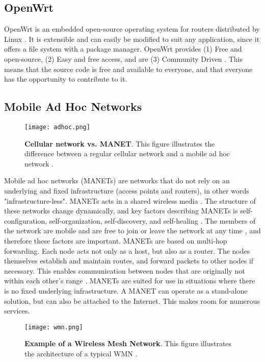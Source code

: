 \subsection{OpenWrt}
\label{subsec:openwrt}
OpenWrt is an embedded open-source operating system for routers distributed by Linux \cite{openwrt}. It is extensible and can easily be modified to suit any application, since it offers a file system with a package manager. OpenWrt provides (1) Free and open-source, (2) Easy and free access, and are (3) Community Driven \cite{openwrt}. This means that the source code is free and available to everyone, and that everyone has the opportunity to contribute to it. 

\subsection{Mobile Ad Hoc Networks}

\begin{figure}[b]
  \centering
    \texttt{[image: adhoc.png]}
     \caption [Cellular network vs. MANET]{\textbf{Cellular network vs. MANET}. This figure illustrates the difference between a regular cellular network and a mobile ad hoc network \cite{adhoc2}.}
\label{fig:adhoc}
\end{figure}

Mobile ad hoc networks (MANETs) are networks that do not rely on an underlying and fixed infrastructure (access points and routers), in other words "infrastructure-less". MANETs acts in a shared wireless media \cite{adhoc}. The structure of these networks change dynamically, and key factors describing MANETs is self-configuration, self-organization, self-discovery, and self-healing \cite{wmn}. The members of the network are mobile and are free to join or leave the network at any time \cite{adhoc2}, and therefore these factors are important. MANETs are based on multi-hop forwarding. Each node acts not only as a host, but also as a router. The nodes themselves establish and maintain routes, and forward packets to other nodes if necessary. This enables communication between nodes that are originally not within each other's range \cite{adhoc2}. MANETs are suited for use in situations where there is no fixed underlying infrastructure. A MANET can operate as a stand-alone solution, but can also be attached to the Internet. This makes room for numerous services. 

\begin{figure}[b]
  \centering
    \texttt{[image: wmn.png]}
     \caption [Example of a Wireless Mesh Network]{\textbf{Example of a Wireless Mesh Network}. This figure illustrates the architecture of a typical WMN \cite{wmn}.}
\label{fig:wmn}
\end{figure}

